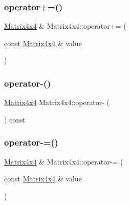 \mbox{\label{struct_math_1_1_matrix4x4_a718f2e437d7a81545cbc09e94a14be17}} 
\subsubsection{\texorpdfstring{operator+=()}{operator+=()}}
{\footnotesize\ttfamily \mbox{\hyperlink{struct_math_1_1_matrix4x4}{Matrix4x4}} \& Matrix4x4\+::operator+= (\begin{DoxyParamCaption}\item[{const \mbox{\hyperlink{struct_math_1_1_matrix4x4}{Matrix4x4}} \&}]{value }\end{DoxyParamCaption})}

\mbox{\label{struct_math_1_1_matrix4x4_a6df8840e180ef2dd22d00b63fd94be29}} 
\subsubsection{\texorpdfstring{operator-\/()}{operator-()}}
{\footnotesize\ttfamily \mbox{\hyperlink{struct_math_1_1_matrix4x4}{Matrix4x4}} Matrix4x4\+::operator-\/ (\begin{DoxyParamCaption}{ }\end{DoxyParamCaption}) const}

\mbox{\label{struct_math_1_1_matrix4x4_a50317a53f50d2f657ddaf9882120a895}} 
\subsubsection{\texorpdfstring{operator-\/=()}{operator-=()}}
{\footnotesize\ttfamily \mbox{\hyperlink{struct_math_1_1_matrix4x4}{Matrix4x4}} \& Matrix4x4\+::operator-\/= (\begin{DoxyParamCaption}\item[{const \mbox{\hyperlink{struct_math_1_1_matrix4x4}{Matrix4x4}} \&}]{value }\end{DoxyParamCaption})}


